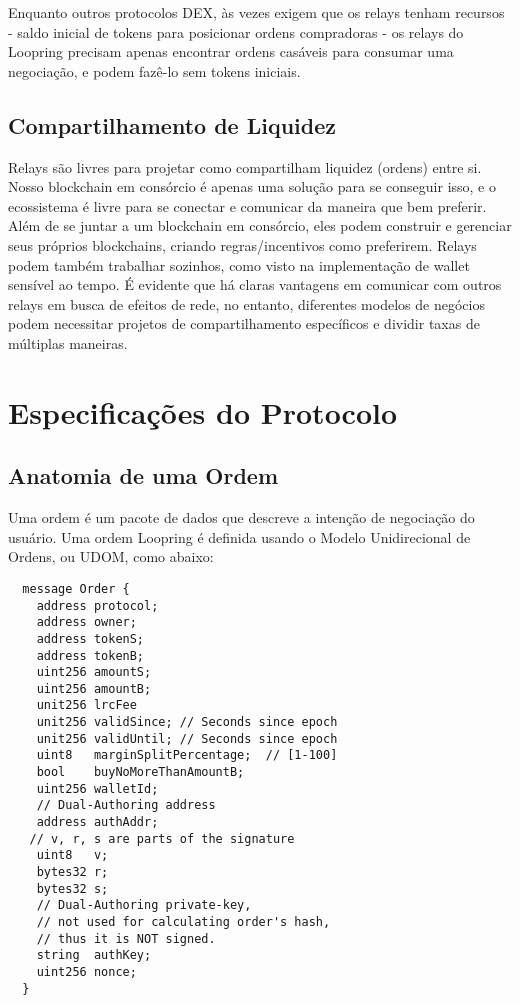\documentclass[UTF8,nofonts]{article}
\begin{document}
\begin{multicols}{2}
Enquanto outros protocolos DEX, às vezes exigem que os relays tenham recursos - saldo inicial de tokens para posicionar ordens compradoras - os relays do Loopring precisam apenas encontrar ordens casáveis para consumar uma negociação, e podem fazê-lo sem tokens iniciais.

\subsection{Compartilhamento de Liquidez\label{sec:liquidity_sharing}}
Relays são livres para projetar como compartilham liquidez (ordens) entre si. Nosso blockchain em consórcio é apenas uma solução para se conseguir isso, e o ecossistema é livre para se conectar e comunicar da maneira que bem preferir. Além de se juntar a um blockchain em consórcio, eles podem construir e gerenciar seus próprios blockchains, criando regras/incentivos como preferirem. Relays podem também trabalhar sozinhos, como visto na implementação de wallet sensível ao tempo. É evidente que há claras vantagens em comunicar com outros relays em busca de efeitos de rede, no entanto, diferentes modelos de negócios podem necessitar projetos de compartilhamento específicos e dividir taxas de múltiplas maneiras.

\section{Especificações do Protocolo\label{sec:protocol}}

\subsection{Anatomia de uma Ordem\label{anatomy}}
Uma ordem é um pacote de dados que descreve a intenção de negociação do usuário. Uma ordem Loopring é definida usando o Modelo Unidirecional de Ordens, ou UDOM, como abaixo:

\begin{verbatim}
  message Order {
    address protocol;
    address owner;
    address tokenS;
    address tokenB;
    uint256 amountS;
    uint256 amountB;
    unit256 lrcFee
    unit256 validSince; // Seconds since epoch
    unit256 validUntil; // Seconds since epoch
    uint8   marginSplitPercentage;  // [1-100]
    bool    buyNoMoreThanAmountB;
    uint256 walletId;
    // Dual-Authoring address
    address authAddr;
   // v, r, s are parts of the signature
    uint8   v;       
    bytes32 r;
    bytes32 s;
    // Dual-Authoring private-key,
    // not used for calculating order's hash,
    // thus it is NOT signed.
    string  authKey;          
    uint256 nonce;
  }
\end{verbatim}


\end{multicols}
\end{document}

